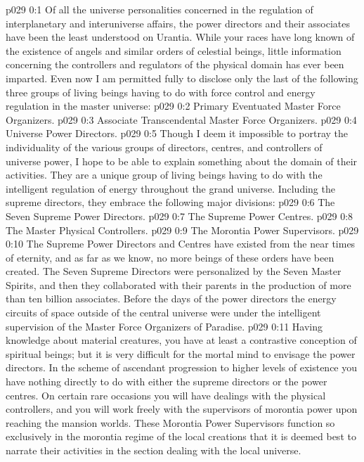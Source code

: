 \author{Universal Censor}
\vs p029 0:1 Of all the universe personalities concerned in the regulation of interplanetary and interuniverse affairs, the power directors and their associates have been the least understood on Urantia. While your races have long known of the existence of angels and similar orders of celestial beings, little information concerning the controllers and regulators of the physical domain has ever been imparted. Even now I am permitted fully to disclose only the last of the following three groups of living beings having to do with force control and energy regulation in the master universe:
\vs p029 0:2 \bibnobreakspace Primary Eventuated Master Force Organizers.
\vs p029 0:3 \bibnobreakspace Associate Transcendental Master Force Organizers.
\vs p029 0:4 \bibnobreakspace Universe Power Directors.
\vs p029 0:5 \pc Though I deem it impossible to portray the individuality of the various groups of directors, centres, and controllers of universe power, I hope to be able to explain something about the domain of their activities. They are a unique group of living beings having to do with the intelligent regulation of energy throughout the grand universe. Including the supreme directors, they embrace the following major divisions:
\vs p029 0:6 \bibnobreakspace The Seven Supreme Power Directors.
\vs p029 0:7 \bibnobreakspace The Supreme Power Centres.
\vs p029 0:8 \bibnobreakspace The Master Physical Controllers.
\vs p029 0:9 \bibnobreakspace The Morontia Power Supervisors.
\vs p029 0:10 \pc The Supreme Power Directors and Centres have existed from the near times of eternity, and as far as we know, no more beings of these orders have been created. The Seven Supreme Directors were personalized by the Seven Master Spirits, and then they collaborated with their parents in the production of more than ten billion associates. Before the days of the power directors the energy circuits of space outside of the central universe were under the intelligent supervision of the Master Force Organizers of Paradise.
\vs p029 0:11 Having knowledge about material creatures, you have at least a contrastive conception of spiritual beings; but it is very difficult for the mortal mind to envisage the power directors. In the scheme of ascendant progression to higher levels of existence you have nothing directly to do with either the supreme directors or the power centres. On certain rare occasions you will have dealings with the physical controllers, and you will work freely with the supervisors of morontia power upon reaching the mansion worlds. These Morontia Power Supervisors function so exclusively in the morontia regime of the local creations that it is deemed best to narrate their activities in the section dealing with the local universe.
